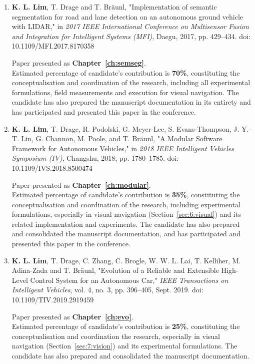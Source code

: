 \begin{enumerate}
	\item \textbf{K. L. Lim}, T. Drage and T. Bräunl, "Implementation of semantic segmentation for road and lane detection on an autonomous ground vehicle with LIDAR," in \textit{2017 IEEE International Conference on Multisensor Fusion and Integration for Intelligent Systems (MFI)}, Daegu, 2017, pp. 429--434. doi: 10.1109/MFI.2017.8170358
	
	Paper presented as \textbf{Chapter~\ref{ch:semseg}}. \\
	Estimated percentage of candidate's contribution is \textbf{70\%}, constituting the conceptualisation and coordination of the research, including all experimental formulations, field measurements and execution for visual navigation. The candidate has also prepared the manuscript documentation in its entirety and has participated and presented this paper in the conference.
	
	\item \textbf{K. L. Lim}, T. Drage, R. Podolski, G. Meyer-Lee, S. Evans-Thompson, J. Y.-T. Lin, G. Channon, M. Poole, and T. Bräunl, "A Modular Software Framework for Autonomous Vehicles," in \textit{2018 IEEE Intelligent Vehicles Symposium (IV)}, Changshu, 2018, pp. 1780--1785. doi: 10.1109/IVS.2018.8500474
	
	Paper presented as \textbf{Chapter~\ref{ch:modular}}. \\
	Estimated percentage of candidate's contribution is \textbf{35\%}, constituting the conceptualisation and coordination of the research, including experimental formulations, especially in visual navigation (Section~\ref{sec:6:visual}) and its related implementation and experiments. The candidate has also prepared and consolidated the manuscript documentation, and has participated and presented this paper in the conference.
	
	\item \textbf{K. L. Lim}, T. Drage, C. Zhang, C. Brogle, W. W. L. Lai, T. Kelliher, M. Adina-Zada and T. Bräunl, "Evolution of a Reliable and Extensible High-Level Control System for an Autonomous Car," \textit{IEEE Transactions on Intelligent Vehicles}, vol. 4, no. 3, pp. 396--405, Sept. 2019. doi: 10.1109/TIV.2019.2919459
	
	Paper presented as \textbf{Chapter~\ref{ch:evo}}. \\
	Estimated percentage of candidate's contribution is \textbf{25\%}, constituting the conceptualisation and coordination the research, especially in visual navigation (Section~\ref{sec:7:vision}) and its experimental formulations. The candidate has also prepared and consolidated the manuscript documentation.
	

\end{enumerate}
